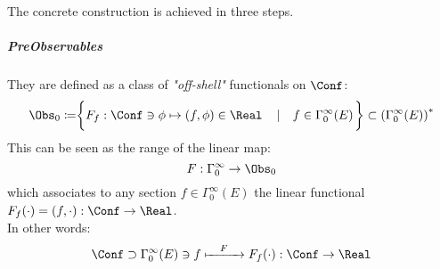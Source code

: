 \documentclass[Main]{subfiles}
\begin{document}
   		
   		The concrete construction is achieved in three steps.

 			\subparagraph{PreObservables}
 				They are defined as a class of \emph{"off-shell"} functionals on $\Conf$:
 				\begin{displaymath}
					\Obs_0 \coloneqq \biggr\{ F_f: \Conf \ni \phi \mapsto ( f, \phi) \in \Real \quad
					\left\vert\quad  f \in \Gamma_0^\infty(E) \right.	\biggr\} \subset \left( \Gamma_0^\infty (E) \right)^*
				\end{displaymath}
   				This can be seen as the range of the linear map:
   				\begin{displaymath}
   					F: \Gamma_0^\infty \rightarrow \Obs_0
  	 			\end{displaymath}
   				which associates to any section $f\in \Gamma_0^\infty(E)$ the linear functional
   				$F_f(\cdot) = (f,\cdot) :\Conf \rightarrow \Real$.\\
   				In other words:
  	 			\begin{displaymath}
   					\Conf 	\supset \Gamma^\infty_0(E) \ni f \xmapsto{\quad F \quad} F_f(\cdot):\Conf \rightarrow \Real
   				\end{displaymath}
\end{document}
